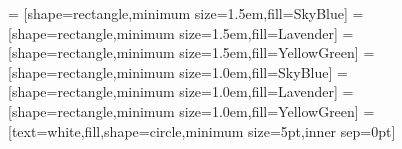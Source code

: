 \usetikzlibrary{arrows.meta,backgrounds,calc,calendar,positioning}
 = [shape=rectangle,minimum size=1.5em,fill=SkyBlue]
   = [shape=rectangle,minimum size=1.5em,fill=Lavender]
   = [shape=rectangle,minimum size=1.5em,fill=YellowGreen]
      = [shape=rectangle,minimum size=1.0em,fill=SkyBlue]
      = [shape=rectangle,minimum size=1.0em,fill=Lavender]
      = [shape=rectangle,minimum size=1.0em,fill=YellowGreen]
     = [text=white,fill,shape=circle,minimum size=5pt,inner sep=0pt]
